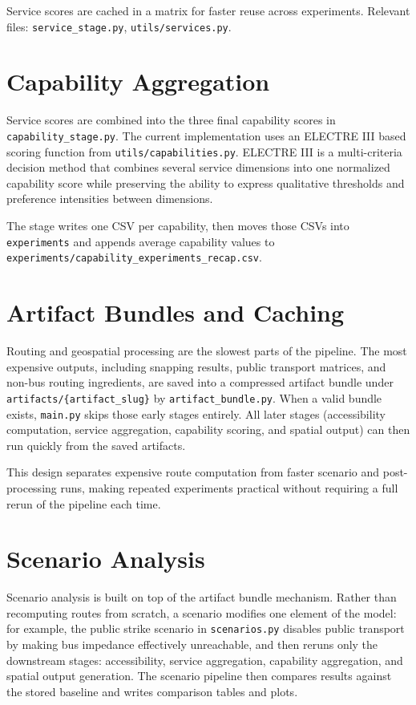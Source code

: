 \documentclass[11pt]{article}
\begin{document}
Service scores are cached in a matrix for faster reuse across experiments. Relevant files: \texttt{service\_stage.py}, \texttt{utils/services.py}.

\section{Capability Aggregation}

Service scores are combined into the three final capability scores in \texttt{capability\_stage.py}. The current implementation uses an ELECTRE III based scoring function from \texttt{utils/capabilities.py}. ELECTRE III is a multi-criteria decision method that combines several service dimensions into one normalized capability score while preserving the ability to express qualitative thresholds and preference intensities between dimensions.

The stage writes one CSV per capability, then moves those CSVs into \texttt{experiments} and appends average capability values to \texttt{experiments/capability\_experiments\_recap.csv}.

\section{Artifact Bundles and Caching}

Routing and geospatial processing are the slowest parts of the pipeline. The most expensive outputs, including snapping results, public transport matrices, and non-bus routing ingredients, are saved into a compressed artifact bundle under \texttt{artifacts/\{artifact\_slug\}} by \texttt{artifact\_bundle.py}. When a valid bundle exists, \texttt{main.py} skips those early stages entirely. All later stages (accessibility computation, service aggregation, capability scoring, and spatial output) can then run quickly from the saved artifacts.

This design separates expensive route computation from faster scenario and post-processing runs, making repeated experiments practical without requiring a full rerun of the pipeline each time.

\section{Scenario Analysis}

Scenario analysis is built on top of the artifact bundle mechanism. Rather than recomputing routes from scratch, a scenario modifies one element of the model: for example, the public strike scenario in \texttt{scenarios.py} disables public transport by making bus impedance effectively unreachable, and then reruns only the downstream stages: accessibility, service aggregation, capability aggregation, and spatial output generation. The scenario pipeline then compares results against the stored baseline and writes comparison tables and plots.
\end{document}
